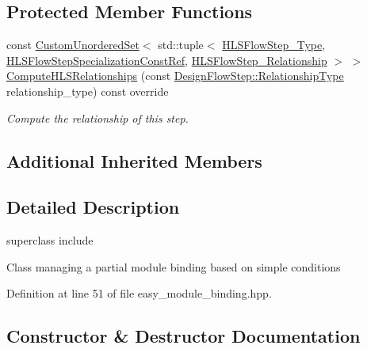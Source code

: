 \subsection*{Protected Member Functions}
\begin{DoxyCompactItemize}
\item 
const \hyperlink{classCustomUnorderedSet}{Custom\+Unordered\+Set}$<$ std\+::tuple$<$ \hyperlink{hls__step_8hpp_ada16bc22905016180e26fc7e39537f8d}{H\+L\+S\+Flow\+Step\+\_\+\+Type}, \hyperlink{hls__step_8hpp_a5fdd2edf290c196531d21d68e13f0e74}{H\+L\+S\+Flow\+Step\+Specialization\+Const\+Ref}, \hyperlink{hls__step_8hpp_a3ad360b9b11e6bf0683d5562a0ceb169}{H\+L\+S\+Flow\+Step\+\_\+\+Relationship} $>$ $>$ \hyperlink{classeasy__module__binding_a627ae750079d8db60409f696cb1310c9}{Compute\+H\+L\+S\+Relationships} (const \hyperlink{classDesignFlowStep_a723a3baf19ff2ceb77bc13e099d0b1b7}{Design\+Flow\+Step\+::\+Relationship\+Type} relationship\+\_\+type) const override
\begin{DoxyCompactList}\small\item\em Compute the relationship of this step. \end{DoxyCompactList}\end{DoxyCompactItemize}
\subsection*{Additional Inherited Members}


\subsection{Detailed Description}
superclass include 

Class managing a partial module binding based on simple conditions 

Definition at line 51 of file easy\+\_\+module\+\_\+binding.\+hpp.



\subsection{Constructor \& Destructor Documentation}
\mbox{\label{classeasy__module__binding_a76bb79e104fdca6cea8642102ddda297}} 
